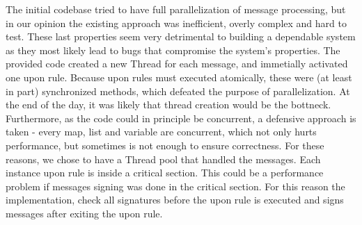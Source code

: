 \documentclass{article}
\begin{document}
The initial codebase tried to have full parallelization of message processing, but
in our opinion the existing approach was inefficient, overly complex and hard to
test. These last properties seem very detrimental to building a dependable system
as they most likely lead to bugs that compromise the system's properties. The 
provided code created a new Thread for each message, and immetially activated
one upon rule. Because upon rules must executed atomically, these were (at least
in part) synchronized methods, which defeated the purpose of parallelization.
At the end of the day, it was likely that thread creation would be the bottneck.
Furthermore, as the code could in principle be concurrent, a defensive approach
is taken - every map, list and variable are concurrent, which not only hurts
performance, but sometimes is not enough to ensure correctness. For these reasons,
we chose to have a Thread pool that handled the messages. Each instance upon
rule is inside a critical section. This could be a performance problem if messages
signing was done in the critical section. For this reason the implementation,
check all signatures before the upon rule is executed and signs messages
after exiting the upon rule.


\end{document}
